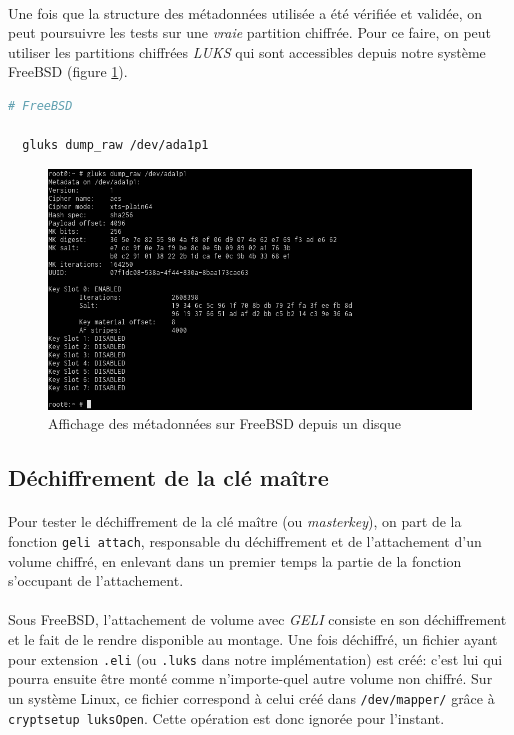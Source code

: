 \paragraph{}
Une fois que la structure des métadonnées utilisée a été vérifiée et validée, on
peut poursuivre les tests sur une \textit{vraie} partition chiffrée. Pour ce
faire, on peut utiliser les partitions chiffrées \textit{LUKS} qui sont
accessibles depuis notre système FreeBSD (figure \ref{fig:freebsd_dump_disk}).
\\
\begin{lstlisting}[language=bash]
  # FreeBSD

  gluks dump_raw /dev/ada1p1
\end{lstlisting}
\begin{figure}[H]
  \centering
  \includegraphics[width=\linewidth]{tests/freebsd_dump_disk.png}
  \caption{\label{fig:freebsd_dump_disk}Affichage des métadonnées sur FreeBSD
    depuis un disque}
\end{figure}

\subsection{Déchiffrement de la clé maître}
\paragraph{}
Pour tester le déchiffrement de la clé maître (ou \textit{masterkey}), on part
de la fonction \texttt{geli attach}, responsable du déchiffrement et de
l'attachement d'un volume chiffré, en enlevant dans un premier temps la partie
de la fonction s'occupant de l'attachement.
\paragraph{}
Sous FreeBSD, l'attachement de volume avec \textit{GELI} consiste en son
déchiffrement et le fait de le rendre disponible au montage. Une fois déchiffré,
un fichier ayant pour extension \texttt{.eli} (ou \texttt{.luks} dans notre
implémentation) est créé: c'est lui qui pourra ensuite être monté comme
n'importe-quel autre volume non chiffré. Sur un système Linux, ce fichier
correspond à celui créé dans \texttt{/dev/mapper/} grâce à \texttt{cryptsetup
  luksOpen}. Cette opération est donc ignorée pour l'instant.

